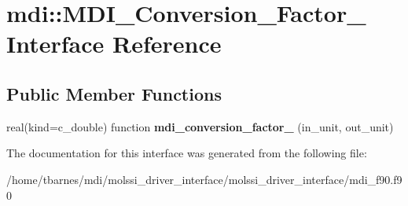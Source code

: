 \hypertarget{interfacemdi_1_1MDI__Conversion__Factor__}{\section{mdi\-:\-:M\-D\-I\-\_\-\-Conversion\-\_\-\-Factor\-\_\- Interface Reference}
\label{interfacemdi_1_1MDI__Conversion__Factor__}
}
\subsection*{Public Member Functions}
\begin{DoxyCompactItemize}
\item 
\hypertarget{interfacemdi_1_1MDI__Conversion__Factor___acad6a9822471076622182f03b6073c77}{real(kind=c\-\_\-double) function {\bfseries mdi\-\_\-conversion\-\_\-factor\-\_\-} (in\-\_\-unit, out\-\_\-unit)}\label{interfacemdi_1_1MDI__Conversion__Factor___acad6a9822471076622182f03b6073c77}

\end{DoxyCompactItemize}


The documentation for this interface was generated from the following file\-:\begin{DoxyCompactItemize}
\item 
/home/tbarnes/mdi/molssi\-\_\-driver\-\_\-interface/molssi\-\_\-driver\-\_\-interface/mdi\-\_\-f90.\-f90\end{DoxyCompactItemize}
